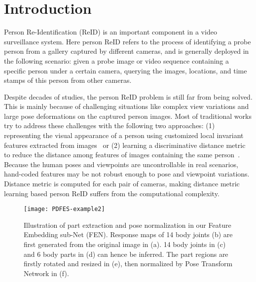 \documentclass[10pt,twocolumn,letterpaper]{article}
\begin{document}
\section{Introduction}
\label{sec1}
Person Re-Identification (ReID) is an important component in a video surveillance system. Here person ReID refers to the process of identifying a probe person from a gallery captured by different cameras, and is generally deployed in the following scenario: given a probe image or video sequence containing a specific person under a certain camera, querying the images, locations, and time stamps of this person from other cameras.

Despite decades of studies, the person ReID problem is still far from being solved. This is mainly because of challenging situations like complex view variations and large pose deformations on the captured person images. Most of traditional works try to address these challenges with the following two approaches: (1) representing the visual appearance of a person using customized local invariant features extracted from images~\cite{farenzena2010person, cheng2011custom, ma2012bicov, liu2012person, zhao2013unsupervised, wang2014person, Zheng_2015_CVPR, su2017attributes} or (2) learning a discriminative distance metric to reduce the distance among features of images containing the same person~\cite{ma2013domain, dikmen2011pedestrian, hirzer2012relaxed, pedagadi2013local, yan2007graph, kostinger2012large, xiong2014person, liu2013pop, li2013learning, zheng2013re, wang2014personvideo, chen2015similarity, liao2015person, chen2015mirror, shen2015person, liao2015efficient, ding2015deep, pengunsupervised, zhang2016learning}. Because the human poses and viewpoints are uncontrollable in real scenarios, hand-coded features may be not robust enough to pose and viewpoint variations. Distance metric is computed for each pair of cameras, making distance metric learning based person ReID suffers from the  computational complexity.
\begin{figure}
\centering \texttt{[image: PDFES-example2]}\\
\vspace{-2mm}
\caption{Illustration of part extraction and pose normalization in our Feature Embedding sub-Net (FEN). Response maps of 14 body joints (b) are first generated from the original image in (a). 14 body joints in (c) and 6 body parts in (d) can hence be inferred. The part regions are firstly rotated and resized in (e), then normalized by Pose Transform Network in (f). }
\vspace{-4mm}
\label{fig:pdfes-example}
\end{figure}
\end{document}
